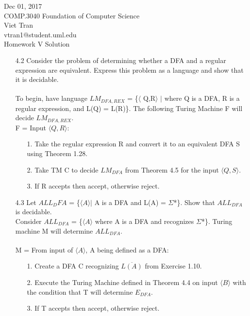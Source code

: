 \documentclass{scrartcl}
\begin{document}
\noindent Dec 01, 2017 \\
COMP.3040 Foundation of Computer Science\\
Viet Tran\\vtran1@student.uml.edu \\
 Homework V Solution
\\

\begin{enumerate}
	\item[4.2] Consider the problem of determining whether a DFA and a regular expression are equivalent. Express this problem as a language and show that it is decidable. \\ \\
	To begin, have language $LM_{DFA,REX}$ = \{$\langle$ Q,R$\rangle$ $|$ where Q is a DFA, R is a regular expression, and L(Q) = L(R)\}. The following Turing Machine F will decide $LM_{DFA,REX}.$\\
	
	F = Input $\langle Q, R \rangle$: \\ 
	\begin{enumerate}
		\item[1.] Take the regular expression R and convert it to an equivalent DFA S using Theorem 1.28.
		
		\item[2.] Take TM C to decide $LM_{DFA}$ from Theorem 4.5 for the input $\langle Q,S \rangle$.
		\item[3.] If R accepts then accept, otherwise reject.\\
	\end{enumerate}
	
	\item[4.3] Let $ALL_DFA$ = \{$\langle A\rangle$$|$ A is a DFA and L(A) = $\Sigma$*\}. Show that $ALL_{DFA}$ is decidable.\\
	
	Consider $ALL_{DFA}$ = \{$\langle A\rangle$ where A is a DFA and recognizes $\Sigma$*\}. Turing machine M will determine $ALL_{DFA}$.\\ \\
	M = From input of $\langle A\rangle$, A being defined as a DFA:
	\begin{enumerate}
		\item[1.] Create a DFA C recognizing $\overline{L(A)}$ from Exercise 1.10.
		
		\item[2.] Execute the Turing Machine defined in Theorem 4.4 on input $\langle B\rangle$ with the condition that T will determine $E_{DFA}$.
		\item[3.] If T accepts then accept, otherwise reject.\\
	\end{enumerate}
	

\end{enumerate}
\end{document}

